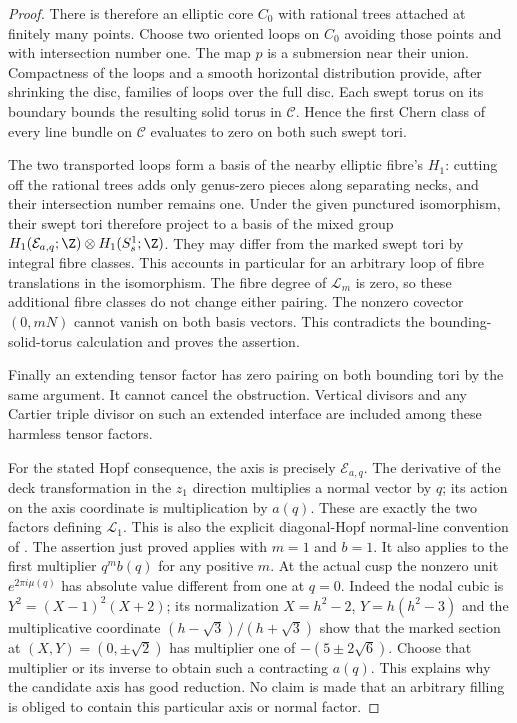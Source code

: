 \begin{proof}
There is therefore an elliptic core $C_0$ with rational
trees attached at finitely many points.  Choose two
oriented loops on $C_0$ avoiding those points and with
intersection number one.  The map $p$ is a submersion
near their union.  Compactness of the loops and a smooth
horizontal distribution provide, after shrinking the
disc, families of loops over the full disc.  Each swept
torus on its boundary bounds the resulting solid torus
in $\mathcal C$.  Hence the first Chern class of every
line bundle on $\mathcal C$ evaluates to zero on both
such swept tori.

The two transported loops form a basis of the nearby
elliptic fibre's $H_1$: cutting off the rational trees
adds only genus-zero pieces along separating necks,
and their intersection number remains one.  Under the
given punctured isomorphism, their swept tori therefore
project to a basis of the mixed group
$H_1(\mathcal E_{a,q};\Z)\otimes H_1(S_s^1;\Z)$.
They may differ from the marked swept tori by integral
fibre classes.  This accounts in particular for an
arbitrary loop of fibre translations in the isomorphism.
The fibre degree of $\mathcal L_m$ is zero, so these
additional fibre classes do not change either pairing.
The nonzero covector $(0,mN)$ cannot vanish on both
basis vectors.  This contradicts the bounding-solid-torus
calculation and proves the assertion.

Finally an extending tensor factor has zero pairing on
both bounding tori by the same argument.  It cannot
cancel the obstruction.  Vertical divisors and any
Cartier triple divisor on such an extended interface
are included among these harmless tensor factors.

For the stated Hopf consequence, the axis is precisely
$\mathcal E_{a,q}$.
The derivative of the deck transformation in the $z_1$
direction multiplies a normal vector by $q$; its action
on the axis coordinate is multiplication by $a(q)$.
These are exactly the two factors defining
$\mathcal L_1$.  This is also the explicit diagonal-Hopf
normal-line convention of
\citet[Section 2.2]{AbashevaDeev2024AB}.
The assertion just proved applies with $m=1$ and $b=1$.
It also applies to the first multiplier $q^m b(q)$ for
any positive $m$.  At the actual cusp the nonzero unit
$e^{2\pi i\mu(q)}$ has absolute value different from one
at $q=0$.  Indeed the nodal cubic is
$Y^2=(X-1)^2(X+2)$; its normalization
$X=h^2-2$, $Y=h(h^2-3)$ and the multiplicative coordinate
$(h-\sqrt3)/(h+\sqrt3)$ show that the marked section at
$(X,Y)=(0,\pm\sqrt2)$ has multiplier one of
$-(5\pm2\sqrt6)$.
Choose that multiplier or its inverse to obtain
such a contracting $a(q)$.
This explains why the candidate axis has good reduction.
No claim is made that an arbitrary filling is obliged
to contain this particular axis or normal factor.
\end{proof}

